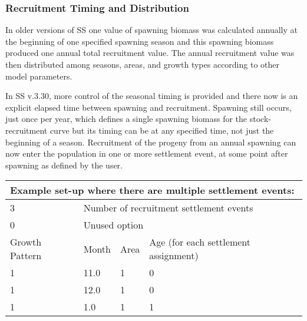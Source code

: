 \subsubsection{Recruitment Timing and Distribution}
In older versions of SS one value of spawning biomass was calculated annually at the beginning of one specified spawning season and this spawning biomass produced one annual total recruitment value. The annual recruitment value was then distributed among seasons, areas, and growth types according to other model parameters.

In SS v.3.30, more control of the seasonal timing is provided and there now is an explicit elapsed time between spawning and recruitment. Spawning still occurs, just once per year, which defines a single spawning biomass for the stock-recruitment curve but its timing can be at any specified time, not just the beginning of a season.  Recruitment of the progeny from an annual spawning can now enter the population in one or more settlement event, at some point after spawning as defined by the user.  

\begin{center}
	\begin{tabular}{p{3cm} p{2cm} p{2cm} p{7cm}}
		\multicolumn{4}{l}{Example set-up where there are multiple settlement events:}\\
		\hline
		3 & \multicolumn{3}{l}{Number of recruitment settlement events}\Tstrut\\
		0 & \multicolumn{3}{l}{Unused option}\Bstrut\\
		\hline
		Growth Pattern & Month & Area & Age (for each settlement assignment)\Tstrut\Bstrut\\
		\hline
		1 & 11.0 & 1 & 0 \Tstrut\\
		1 & 12.0 & 1 & 0 \\
		1 & 1.0  & 1 & 1 \Bstrut\\
		\hline
	\end{tabular}		
\end{center}

